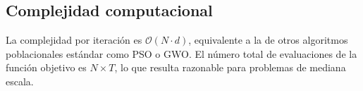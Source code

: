 \documentclass[12pt,a4paper]{article}
\begin{document}
\subsection{Complejidad computacional}

La complejidad por iteración es $\mathcal{O}(N \cdot d)$, equivalente a la de otros algoritmos poblacionales estándar como PSO o GWO. El número total de evaluaciones de la función objetivo es $N \times T$, lo que resulta razonable para problemas de mediana escala.






\end{document}
